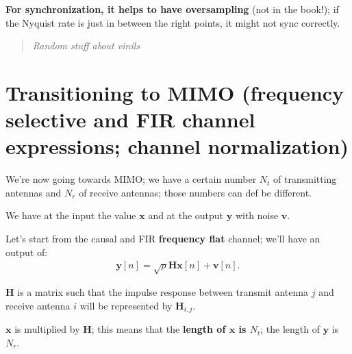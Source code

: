 \documentclass[a4paper, 12pt]{book}
\begin{document}
\begin{center}
\end{center}

\textbf{For synchronization, it helps to have oversampling} (not in the book!); if the Nyquist rate is just in between the right points, it might not sync correctly.

\begin{quote}
    \small \textit{\color{gray} Random stuff about vinils}
\end{quote}

\section[Transitioning to MIMO]{Transitioning to MIMO (frequency selective and FIR channel expressions; channel normalization)}

We're now going towards MIMO; we have a certain number $N_t$ of transmitting antennas and $N_r$ of receive antennas; those numbers can def be different.

We have at the input the value $\mathbf{x}$ and at the output $\mathbf{y}$ with noise $\mathbf{v}$.

Let's start from the causal and FIR \textbf{frequency flat} channel; we'll have an output of:
\begin{align}
\mathbf{y}[n] = \sqrt{\rho}\mathbf{H}\mathbf{x}[n] + \mathbf{v}[n]. \tag{2.81}
\end{align}

$\mathbf{H}$ is a matrix such that the impulse response between transmit antenna $j$ and receive antenna $i$ will be represented by $\mathbf{H}_{i,j}$.

\noindent{}

$\mathbf{x}$ is multiplied by $\mathbf{H}$; this means that the \textbf{length of $\mathbf{x}$ is $N_t$}; the length of $\mathbf{y}$ is $N_r$.
\end{document}

